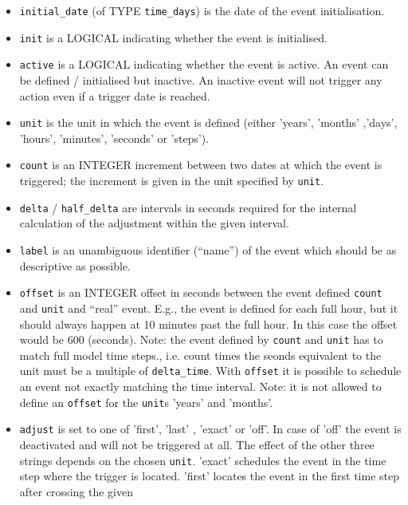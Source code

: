 \documentclass[twoside]{article}
\begin{document}
\begin{itemize}
\item \verb|initial_date| (of {\footnotesize TYPE} \verb|time_days|) is the date
       of the event initialisation.
\item \verb|init| is a {\footnotesize LOGICAL} indicating whether the event 
      is initialised.
\item \verb|active| is a {\footnotesize LOGICAL} indicating whether the event
      is active. An event can be defined / initialised but inactive. An inactive
      event will not trigger any action even if a trigger date is reached.
\item \verb|unit| is the unit in which the event is defined (either 'years',
      'months' ,'days', 'hours', 'minutes', 'seconds' or 'steps').
\item \verb|count| is an {\footnotesize INTEGER} increment between two dates at
      which the event is triggered; the increment is given in the unit
      specified by \verb|unit|.
\item \verb|delta| / \verb|half_delta| are intervals in seconds required for
      the internal calculation of the adjustment within the given interval.
\item \verb|label| is an unambiguous identifier (``name'') of the event which
      should be as descriptive as possible.
\item \verb|offset| is an {\footnotesize INTEGER} offset in seconds between the
      event defined \verb|count| and  \verb|unit| and  ``real'' event.  E.g.,
      the event is defined for each full hour, but it should always happen at 
      10 minutes past the full hour. In this case the offset would be 600
      (seconds). Note: the event defined by  \verb|count| and  \verb|unit| has
      to match full model time steps., i.e. count times the seonds equivalent to
      the unit must be a multiple of \verb|delta_time|. With \verb|offset| it is
      possible to schedule an event not exactly matching the time interval.  
      Note: it is not allowed to define an \verb|offset| for the \verb|unit|s
      'years' and  'months'.
\item \verb|adjust| is set to one of 'first', 'last' , 'exact' or 'off'.
      In case of 'off' the event is deactivated and will not be triggered
      at all.
      The effect of the other three strings depends on the chosen \verb|unit|.
      'exact' schedules the event in the time step where the trigger is located.
      'first' locates the event in the first time step after crossing the given

\end{itemize}
\end{document}
